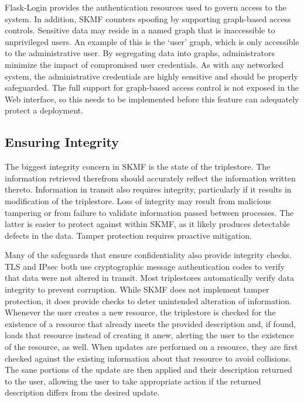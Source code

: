 Flask-Login provides the authentication resources used to govern access to the system. In addition, SKMF counters spoofing by supporting graph-based access controls. Sensitive data may reside in a named graph that is inaccessible to unprivileged users. An example of this is the `user' graph, which is only accessible to the administrative user. By segregating data into graphs, administrators minimize the impact of compromised user credentials. As with any networked system, the administrative credentials are highly sensitive and should be properly safeguarded. The full support for graph-based access control is not exposed in the Web interface, so this needs to be implemented before this feature can adequately protect a deployment.


\subsection{Ensuring Integrity}
\label{result:integrity}

The biggest integrity concern in SKMF is the state of the triplestore. The information retrieved therefrom should accurately reflect the information written thereto. Information in transit also requires integrity, particularly if it results in modification of the triplestore. Loss of integrity may result from malicious tampering or from failure to validate information passed between processes. The latter is easier to protect against within SKMF, as it likely produces detectable defects in the data. Tamper protection requires proactive mitigation.

Many of the safeguards that ensure confidentiality also provide integrity checks. TLS and IPsec both use cryptographic message authentication codes to verify that data were not altered in transit. Most triplestores automatically verify data integrity to prevent corruption. While SKMF does not implement tamper protection, it does provide checks to deter unintended alteration of information. Whenever the user creates a new resource, the triplestore is checked for the existence of a resource that already meets the provided description and, if found, loads that resource instead of creating it anew, alerting the user to the existence of the resource, as well. When updates are performed on a resource, they are first checked against the existing information about that resource to avoid collisions. The sane portions of the update are then applied and their description returned to the user, allowing the user to take appropriate action if the returned description differs from the desired update.

